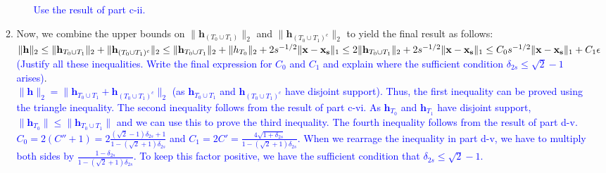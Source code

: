 \documentclass[11pt]{article}
\begin{document}
\begin{enumerate}
\begin{enumerate}
\begin{enumerate}
\textcolor{blue}{
Use the result of part c-ii.
}
\end{enumerate}
\item Now, we combine the upper bounds on $\|\mathbf{h}_{(T_0 \cup T_1)}\|_2$ and $\|\mathbf{h}_{(T_0 \cup T_1)^c}\|_2$ to yield the final result as follows: \\
$\|\mathbf{h}\|_2 \leq \|\mathbf{h}_{T_0 \cup T_1}\|_2 + \|\mathbf{h}_{(T_0 \cup T_1)^c}\|_2 \leq \|\mathbf{h}_{T_0 \cup T_1}\|_2 + \|h_{T_0}\|_2 + 2s^{-1/2}\|\mathbf{x}-\mathbf{x_s}\|_1 \\
\leq 2 \|\mathbf{h}_{T_0 \cup T_1}\|_2 + 2s^{-1/2}\|\mathbf{x}-\mathbf{x_s}\|_1 \leq C_0 s^{-1/2} \|\mathbf{x}-\mathbf{x_s}\|_1 + C_1 \epsilon$ \textcolor{blue}{(Justify all these inequalities. Write the final expression for $C_0$ and $C_1$ and explain where the sufficient condition $\delta_{2s} \leq \sqrt{2}-1$ arises)}.\\
\textcolor{blue}{
$\|\mathbf{h}\|_2 = \|\mathbf{h}_{T_0 \cup T_1} + \mathbf{h}_{(T_0 \cup T_1)^c}\|_2$ (as $\mathbf{h}_{T_0 \cup T_1}$ and $\mathbf{h}_{(T_0 \cup T_1)^c}$ have disjoint support). Thus, the first inequality can be proved using the triangle inequality. The second inequality follows from the result of part c-vi. As $\mathbf{h}_{T_0}$ and $\mathbf{h}_{T_1}$ have disjoint support, $\|\mathbf{h}_{T_0}\| \leq \|\mathbf{h}_{T_0 \cup T_1}\|$ and we can use this to prove the third inequality. The fourth inequality follows from the result of part d-v. $C_0 = 2(C''+1) = 2\frac{(\sqrt{2}-1)\delta_{2s}+1}{1-(\sqrt{2}+1)\delta_{2s}}$ and $C_1 = 2C' = \frac{4\sqrt{1+\delta_{2s}}}{1-(\sqrt{2}+1)\delta_{2s}}$. When we rearrage the inequality in part d-v, we have to multiply both sides by $\frac{1-\delta_{2s}}{1-(\sqrt{2}+1)\delta_{2s}}$. To keep this factor positive, we have the sufficient condition that $\delta_{2s} \leq \sqrt{2}-1$.
}
\end{enumerate}


\end{enumerate}
\end{document}
